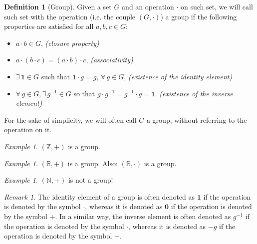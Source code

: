 \documentclass[a4paper,11pt,titlepage, article, oneside]{memoir}
\numberwithin{equation}{section}
\theoremstyle{definition}
\newtheorem{definition}[theorem]{Definition}
\theoremstyle{remark}
\newtheorem{remark}[theorem]{Remark}
\newtheorem{example}[theorem]{Example}
\begin{document}
\begin{definition} [Group] Given a set $G$ and an operation $\cdot$ on such set, we will call such set with the operation  (i.e. the couple $(G, \cdot)$) a group if the following properties are satisfied for all $a, b, c \in G$:
\begin{itemize}
\item $ a \cdot b \in G$,
\hspace*{\fill}\textit{(closure property)}
\item $a \cdot (b \cdot c) = (a \cdot b) \cdot c$,
\hspace*{\fill}\textit{(associativity)}
\item $\exists\, \mathbf{1} \in G$ such that $\mathbf{1} \cdot g = g, \, \forall\, g \in G$,
\hspace*{\fill}\textit{(existence of the identity element)}
\item $\forall\, g \in G, \exists\, g^{-1} \in G$ so that $g \cdot g^{-1} = g^{-1} \cdot g = \mathbf{1}$.
\hspace*{\fill} \textit{(existence of the inverse element)}
\end{itemize}
For the sake of simplicity, we will often call $G$ a group, without referring to the operation on it.
\end{definition}


\begin{tcolorbox}\begin{example}
$(\mathbb{Z}, +)$ is a group.
\end{example}\end{tcolorbox}

\begin{tcolorbox}\begin{example}
$(\mathbb{R}, +)$ is a group. Also: $(\mathbb{R}, \cdot)$ is a group.
\end{example}\end{tcolorbox}

\begin{tcolorbox}\begin{example}
$(\mathbb{N}, +)$ is not a group!
\end{example}\end{tcolorbox}

\begin{remarkbox}\begin{remark} \label{zeroone}
The identity element of a group is often denoted as $\mathbf{1}$ if the operation is denoted by the symbol $\cdot$, whereas it is denoted as $\mathbf{0}$ if the operation is denoted by the symbol $+$.
In a similar way, the inverse element is often denoted as $g^{-1}$ if the operation is denoted by the symbol $\cdot$, whereas it is denoted as $-g$ if the operation is denoted by the symbol $+$.

\end{remark}\end{remarkbox}
\end{document}
